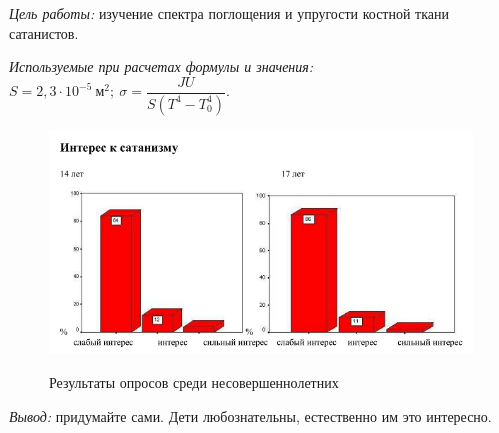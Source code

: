 \documentclass[pscyr,nonums]{hedlabwork}
\begin{document}
  \makeheader

  \emph{Цель работы:} изучение спектра поглощения и упругости костной ткани
    сатанистов.
  
  \emph{Используемые при расчетах формулы и значения:}
  \( S = 2,\!3\cdot10^{-5}~\text{м}^2; \ \sigma = \dfrac{JU}{S(T^4 - T_0^4)} \).

  \begin{figure}[h!]
    \center
    \includegraphics[width=.6\textwidth]{lab_1} \\
    \caption{Результаты опросов среди несовершеннолетних}
  \end{figure}
  
  \emph{Вывод:} придумайте сами. Дети любознательны, естественно им это
    интересно.
\end{document}
